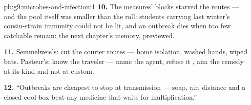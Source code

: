 \begin{solution}{pb:g9:microbes-and-infection:1}
\textbf{10.} The measures' blocks starved the routes ---
and the pool itself was smaller than the roll: students
carrying last winter's cousin-strain immunity could not
be lit, and an outbreak dies when too few catchable
remain: the next chapter's memory, previewed.

\textbf{11.} Semmelweis's: cut the courier routes ---
home isolation, washed hands, wiped bats. Pasteur's:
know the traveler --- name the agent, refuse it
, aim the remedy at its kind and not at
custom.

\textbf{12.} ``Outbreaks are cheapest to stop at
transmission --- soap, air, distance and a closed
cool-box beat any medicine that waits for
multiplication.''
\end{solution}
